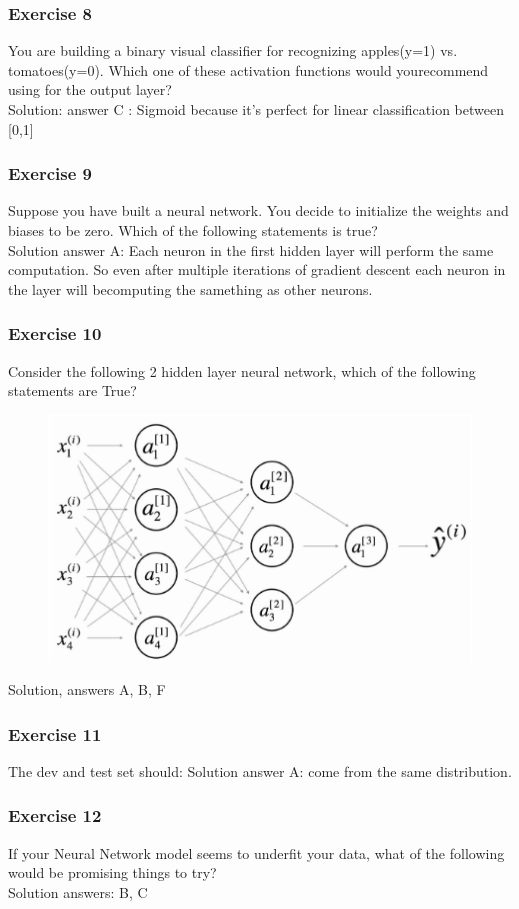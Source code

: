\subsubsection{Exercise 8}
You are building a binary visual classifier for recognizing apples(y=1) vs. tomatoes(y=0). Which one of these activation functions would yourecommend using for the output layer?
\\Solution: answer C : Sigmoid because it's perfect for linear classification between [0,1]
\subsubsection{Exercise 9}
Suppose you have built a neural network. You decide to initialize the weights and biases to be zero. Which of the following statements is true?\\
Solution answer A: Each neuron in the first hidden layer will perform the same computation. So even after multiple iterations of gradient descent each neuron in the layer will becomputing the samething as other neurons.
\subsubsection{Exercise 10}
Consider the following 2 hidden layer neural network, which of the following statements are True?
\begin{figure}[htbp]
    \centering
    \includegraphics[width=12cm]{ExerciseBook/01-NeuralNetwork/exercise10.png}\newline
\end{figure}
Solution, answers A, B, F
\subsubsection{Exercise 11}
The dev and test set should:
Solution answer A: come from the same distribution.
\subsubsection{Exercise 12}
If your Neural Network model seems to underfit your data, what of the following would be promising things to try?\\
Solution answers: B, C